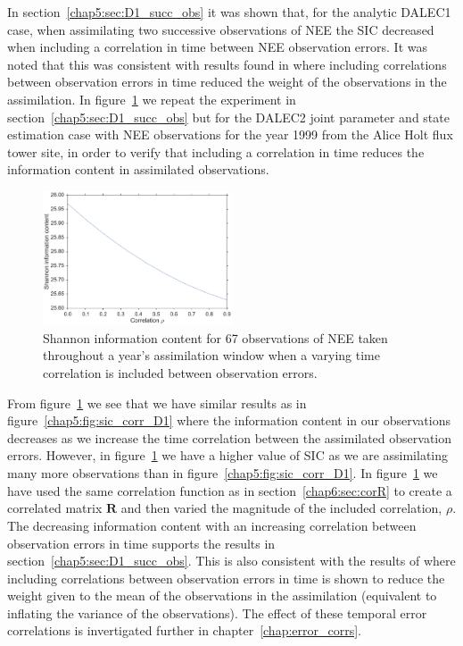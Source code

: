 In section~\ref{chap5:sec:D1_succ_obs} it was shown that, for the analytic DALEC1 case, when assimilating two successive observations of NEE the SIC decreased when including a correlation in time between NEE observation errors. It was noted that this was consistent with results found in \citet{jarvinen1999variational} where including correlations between observation errors in time reduced the weight of the observations in the assimilation. In figure~\ref{chap5:fig:sic_corr_D2} we repeat the experiment in section~\ref{chap5:sec:D1_succ_obs} but for the DALEC2 joint parameter and state estimation case with NEE observations for the year 1999 from the Alice Holt flux tower site, in order to verify that including a correlation in time reduces the information content in assimilated observations. 
\begin{figure}[ht]
	\centering
        \includegraphics[width=0.5\textwidth]{chapter/chapter5/sic_corr_D2_nee.pdf}
    \caption{Shannon information content for 67 observations of NEE taken throughout a year's assimilation window when a varying time correlation is included between observation errors.}
    \label{chap5:fig:sic_corr_D2}
\end{figure}
From figure~\ref{chap5:fig:sic_corr_D2} we see that we have similar results as in figure~\ref{chap5:fig:sic_corr_D1} where the information content in our observations decreases as we increase the time correlation between the assimilated observation errors. However, in figure~\ref{chap5:fig:sic_corr_D2} we have a higher value of SIC as we are assimilating many more observations than in figure~\ref{chap5:fig:sic_corr_D1}. In figure~\ref{chap5:fig:sic_corr_D2} we have used the same correlation function as in section~\ref{chap6:sec:corR} to create a correlated matrix \(\hat{\textbf{R}}\) and then varied the magnitude of the included correlation, \(\rho\). The decreasing information content with an increasing correlation between observation errors in time supports the results in section~\ref{chap5:sec:D1_succ_obs}. This is also consistent with the results of \citet{jarvinen1999variational} where including correlations between observation errors in time is shown to reduce the weight given to the mean of the observations in the assimilation (equivalent to inflating the variance of the observations). The effect of these temporal error correlations is invertigated further in chapter~\ref{chap:error_corrs}. 

